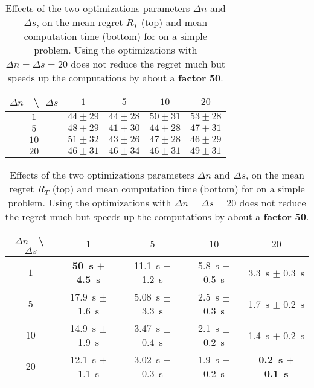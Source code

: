 \begin{table}[!h]
    \centering
        \begin{tabular}{c|cccc}
            $\Delta n$ $\;$ \textbackslash $\;$ $\Delta s$ & $1$ & $5$ & $10$ & $20$ \\
            \hline
            $1$ & $44 \pm 29$ & $44 \pm 28$ & $50 \pm 31$ & $53 \pm 28$ \\
            $5$ & $48 \pm 29$ & $41 \pm 30$ & $44 \pm 28$ & $47 \pm 31$ \\
            $10$ & $51 \pm 32$ & $43 \pm 26$ & $47 \pm 28$ & $46 \pm 29$ \\
            $20$ & $46 \pm 31$ & $46 \pm 34$ & $46 \pm 31$ & $49 \pm 31$
        \end{tabular}
    \hspace{0.5cm}

        \begin{tabular}{c|cccc}
            $\Delta n$ $\;$ \textbackslash $\;$ $\Delta s$
            & $1$ & $5$ & $10$ & $20$ \\
            \hline
            $1$ & \textbf{\SI{50}{\second} $\pm$ \SI{4.5}{\second}} & \SI{11.1}{\second} $\pm$ \SI{1.2}{\second} & \SI{5.8}{\second} $\pm$ \SI{0.5}{\second} & \SI{3.3}{\second} $\pm$ \SI{0.3}{\second} \\
            $5$ & \SI{17.9}{\second} $\pm$ \SI{1.6}{\second} & \SI{5.08}{\second} $\pm$ \SI{3.3}{\second} & \SI{2.5}{\second} $\pm$ \SI{0.3}{\second} & \SI{1.7}{\second} $\pm$ \SI{0.2}{\second}  \\
            $10$ & \SI{14.9}{\second} $\pm$ \SI{1.9}{\second} & \SI{3.47}{\second} $\pm$ \SI{0.4}{\second} & \SI{2.1}{\second} $\pm$ \SI{0.2}{\second} & \SI{1.4}{\second} $\pm$ \SI{0.2}{\second} \\
            $20$ & \SI{12.1}{\second} $\pm$ \SI{1.1}{\second} & \SI{3.02}{\second} $\pm$ \SI{0.3}{\second} & \SI{1.9}{\second} $\pm$ \SI{0.2}{\second} & \textbf{\SI{0.2}{\second} $\pm$ \SI{0.1}{\second}}
        \end{tabular}
    \caption{Effects of the two optimizations parameters $\Delta n$ and $\Delta s$, on the mean regret $R_T$ (top) and mean computation time (bottom) for \GLRklUCB{} on a simple problem. Using the optimizations with $\Delta n = \Delta s = 20$ does not reduce the regret much but speeds up the computations by about a \textbf{factor} $\mathbf{50}$.}
    \label{table:6:effectOptimizations}
\end{table}


